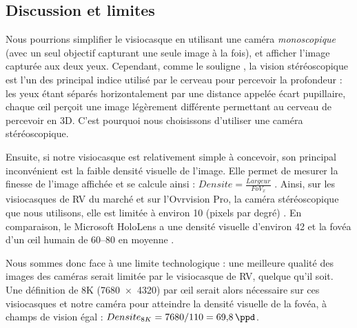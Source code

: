 \subsection{Discussion et limites}
Nous pourrions simplifier le visiocasque en utilisant une caméra \emph{monoscopique} (avec un seul objectif capturant une seule image à la fois), et afficher l'image capturée aux deux yeux. Cependant, comme le souligne \cite{Bourke1999}, la vision stéréoscopique est l'un des principal indice utilisé par le cerveau pour percevoir la profondeur : les yeux étant séparés horizontalement par une distance appelée écart pupillaire, chaque \oe il perçoit une image légèrement différente  permettant au cerveau de percevoir en 3D. C'est pourquoi nous choisissons d'utiliser une caméra stéréoscopique.


Ensuite, si notre visiocasque est relativement simple à concevoir, son principal inconvénient est la faible densité visuelle de l'image. Elle permet de mesurer la finesse de l'image affichée et se calcule ainsi : $Densite = \frac{Largeur}{FoV_x}$ \citep{Boger2017}. Ainsi, sur les visiocasques de RV du marché et sur l'Ovrvision Pro, la caméra stéréoscopique que nous utilisons, elle est limitée à environ \SI{10}{\ppd} (pixels par degré) . En comparaison, le Microsoft HoloLens a une densité visuelle d'environ \SI{42}{\ppd} et la fovéa d'un \oe il humain de \SIrange{60}{80}{\ppd} en moyenne \citep{Kistner2014}.

Nous sommes donc face à une limite technologique : une meilleure qualité des images des caméras serait limitée par le visiocasque de RV, quelque qu'il soit. Une définition de 8K (\SI{7680x4320}{\px}) par \oe il serait alors nécessaire sur ces visiocasques et notre caméra pour atteindre la densité visuelle de la fovéa, à champs de vision égal : $Densite_{8K} = 7680 / 110 = \SI{69.8}{\ppd}$.

